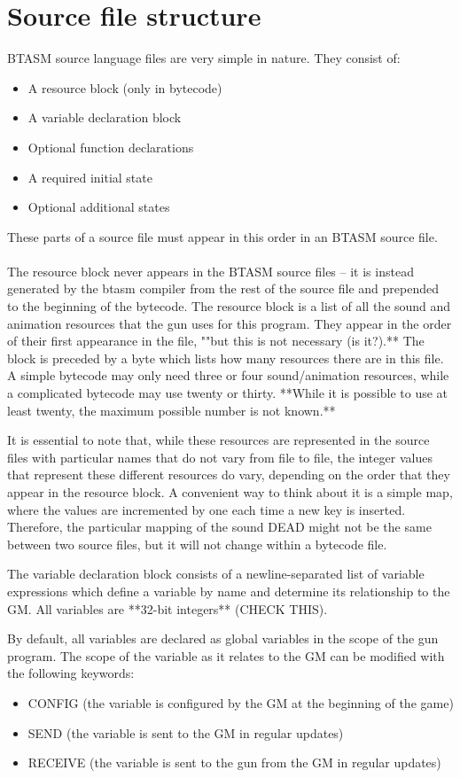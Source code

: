 \documentclass[12pt,a4paper]{scrbook}
\begin{document}
\section{Source file structure}
BTASM source language files are very simple in nature.  They consist of:
\begin{itemize}
\item A resource block (only in bytecode)
\item A variable declaration block
\item Optional function declarations
\item A required initial state
\item Optional additional states
\end{itemize}

These parts of a source file must appear in this order in an BTASM source file.  
\\\\
The resource block never appears in the BTASM source files -- it is instead generated by the btasm
compiler from
the rest of the source file and prepended to the beginning of the bytecode.  The resource block is 
a list of all the sound and animation resources that the gun uses for this program.  They appear in
the order of their first appearance in the file, ""but this is not necessary  (is it?).**  
The block is preceded by a byte which lists how many resources there are in this file.  A simple
bytecode may only need three or four sound/animation resources, while a complicated bytecode may use
twenty or thirty.  **While it is possible to use at least twenty, the maximum possible number is 
not known.**  

It is essential to note that, while these resources are represented in the source files with 
particular names that do not vary from file to file, the integer values that represent these 
different resources do vary, depending on the order that they appear in the resource block.  A 
convenient way to think about it is a simple map, where the values are incremented by one each time
a new key is inserted.  Therefore, the particular mapping of the sound DEAD might not be the same 
between two source files, but it will not change within a bytecode file.

The variable declaration block consists of a newline-separated list of variable expressions
which define a variable by name and determine its relationship to the GM.  All variables are 
**32-bit integers** (CHECK THIS).  

By default, all variables are declared as global variables in the scope of the gun program.
The scope of the variable as it relates to the GM can be modified with the following keywords:
\begin{itemize}
\item CONFIG (the variable is configured by the GM at the beginning of the game)
\item SEND (the variable is sent to the GM in regular updates)
\item RECEIVE (the variable is sent to the gun from the GM in regular updates)
\end{itemize}
\end{document}
